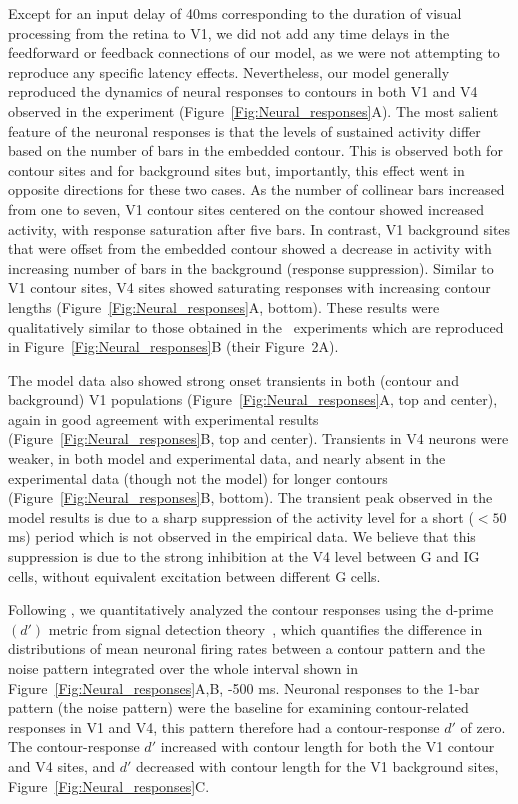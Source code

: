 Except for an input delay of 40ms corresponding to the duration of visual processing from the retina to V1, we did not add any time delays in the feedforward or feedback connections of our model, as we were not attempting to reproduce any specific latency effects. Nevertheless, our model generally reproduced the dynamics of neural responses to contours in both V1 and V4 observed in the \cite{Chen_etal14} experiment (Figure~\ref{Fig:Neural_responses}A). The most salient feature of the neuronal responses is that the levels of sustained activity differ based on the number of bars in the embedded contour. This is observed both for contour sites and for background sites but, importantly, this effect went in opposite directions for these two cases.  As the number of collinear bars increased from one to seven, V1 contour sites centered on the contour showed increased activity, with response saturation after five bars. In contrast, V1 background sites that were offset from the embedded contour showed a decrease in activity with increasing number of bars in the background (response suppression). Similar to V1 contour sites, V4 sites showed saturating responses with increasing contour lengths (Figure~\ref{Fig:Neural_responses}A, bottom). These results were qualitatively similar to those obtained in
the~\cite{Chen_etal14} experiments which are reproduced in
Figure~\ref{Fig:Neural_responses}B (their Figure~2A).

The model data also showed strong onset transients in both (contour
and background) V1 populations (Figure~\ref{Fig:Neural_responses}A,
top and center), again in good agreement with experimental results
(Figure~\ref{Fig:Neural_responses}B, top and center). Transients in V4
neurons were weaker, in both model and experimental data, and nearly
absent in the experimental data (though not the model) for longer contours (Figure~\ref{Fig:Neural_responses}B, bottom). The transient peak observed in the model results is due to a sharp suppression of the activity level for a short ($<50$ms) period which is not observed in the empirical data. We believe that this suppression is due to the  strong inhibition at the V4 level between G and IG cells, without equivalent excitation between different G cells.

Following \cite{Chen_etal14}, we quantitatively analyzed the contour responses using the d-prime $(d')$ metric from signal detection theory~\citep{Green_Swets66}, which quantifies the difference in distributions of mean neuronal firing rates between a contour pattern and the noise pattern integrated over the whole interval shown in Figure~\ref{Fig:Neural_responses}A,B, -500 ms.  Neuronal responses to the 1-bar pattern (the noise pattern) were the baseline for examining contour-related responses in V1 and V4, this pattern therefore had a contour-response $d'$ of zero. The contour-response $d'$ increased with contour length for both the V1 contour and V4 sites, and $d'$ decreased with contour length for the V1 background sites, Figure~\ref{Fig:Neural_responses}C.

